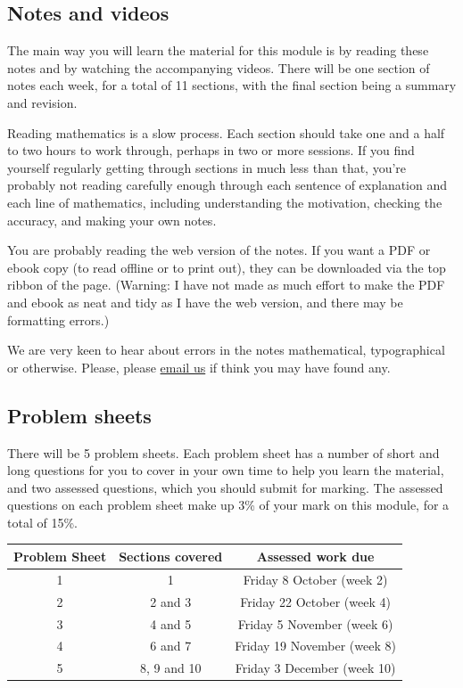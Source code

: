 \documentclass[
  a4paper,
]{book}
\theoremstyle{definition}
\theoremstyle{definition}
\theoremstyle{definition}
\theoremstyle{remark}
\begin{document}
\hypertarget{notes}{%
\subsection*{Notes and videos}\label{notes}}

The main way you will learn the material for this module is by reading these notes and by watching the accompanying videos. There will be one section of notes each week, for a total of 11 sections, with the final section being a summary and revision.

Reading mathematics is a slow process. Each section should take one and a half to two hours to work through, perhaps in two or more sessions. If you find yourself regularly getting through sections in much less than that, you're probably not reading carefully enough through each sentence of explanation and each line of mathematics, including understanding the motivation, checking the accuracy, and making your own notes.

You are probably reading the web version of the notes. If you want a PDF or ebook copy (to read offline or to print out), they can be downloaded via the top ribbon of the page. (Warning: I have not made as much effort to make the PDF and ebook as neat and tidy as I have the web version, and there may be formatting errors.)

We are very keen to hear about errors in the notes mathematical, typographical or otherwise. Please, please \href{mailto:math1710@leeds.ac.uk}{email us} if think you may have found any.

\hypertarget{problem-sheets}{%
\subsection*{Problem sheets}\label{problem-sheets}}

There will be 5 problem sheets. Each problem sheet has a number of short and long questions for you to cover in your own time to help you learn the material, and two assessed questions, which you should submit for marking. The assessed questions on each problem sheet make up 3\% of your mark on this module, for a total of 15\%.

\begin{longtable}[]{@{}ccc@{}}
\toprule
Problem Sheet & Sections covered & Assessed work due \\
\midrule
\endhead
1 & 1 & Friday 8 October (week 2) \\
2 & 2 and 3 & Friday 22 October (week 4) \\
3 & 4 and 5 & Friday 5 November (week 6) \\
4 & 6 and 7 & Friday 19 November (week 8) \\
5 & 8, 9 and 10 & Friday 3 December (week 10) \\
\bottomrule
\end{longtable}
\end{document}
